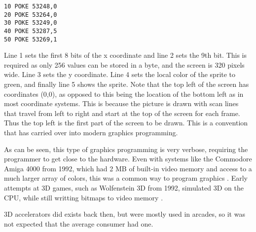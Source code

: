 \begin{lstlisting}[caption={Small BASIC program that places sprite 0 in the top left part of the screen.}]
10 POKE 53248,0
20 POKE 53264,0
30 POKE 53249,0
40 POKE 53287,5
50 POKE 53269,1
\end{lstlisting}


Line 1 sets the first 8 bits of the x coordinate and line 2 sets the 9th bit.
This is required as only 256 values can be stored in a byte, and the screen is 320 pixels wide.
Line 3 sets the y coordinate.
Line 4 sets the local color of the sprite to green, and finally line 5 shows the sprite.
Note that the top left of the screen has coordinates (0,0), as opposed to this being the location of the bottom left as in most coordinate systems.
This is because the picture is drawn with scan lines that travel from left to right and start at the top of the screen for each frame. 
Thus the top left is the first part of the screen to be drawn.
This is a convention that has carried over into modern graphics programming.


As can be seen, this type of graphics programming is very verbose, requiring the programmer to get close to the hardware.  
Even with systems like the Commodore Amiga 4000 from 1992, which had 2 MB of built-in video memory and access to a much larger array of colors, this was a common way to program graphics \cite{wikiAmiga4000}.
Early attempts at 3D games, such as Wolfenstein 3D from 1992, simulated 3D on the \gls{CPU}, while still writting bitmaps to video memory .





3D accelerators did exists back then, but were mostly used in arcades, so it was not expected that the average consumer had one.


